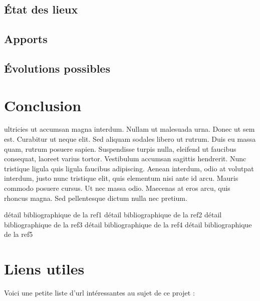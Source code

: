 \documentclass{EPUProjetDi}
\begin{document}
\section{État des lieux}
\section{Apports}

\section{Évolutions possibles}


\chapter*{Conclusion}
 ultricies ut accumsan magna interdum. Nullam ut malesuada urna. Donec ut sem est. Curabitur ut neque elit. Sed aliquam sodales libero ut rutrum. Duis eu massa quam, rutrum posuere sapien. Suspendisse turpis nulla, eleifend ut faucibus consequat, laoreet varius tortor. Vestibulum accumsan sagittis hendrerit. Nunc tristique ligula quis ligula faucibus adipiscing. Aenean interdum, odio at volutpat interdum, justo nunc tristique elit, quis elementum nisi ante id arcu. Mauris commodo posuere cursus. Ut nec massa odio. Maecenas at eros arcu, quis rhoncus magna. Sed pellentesque dictum nulla nec pretium.

\begin{thebibliography}{99}
\label{sec:biblio}
  détail bibliographique de la ref1
  détail bibliographique de la ref2
  détail bibliographique de la ref3
  détail bibliographique de la ref4
  détail bibliographique de la ref5
\end{thebibliography}


\appendix
{}


\chapter{Liens utiles\label{sec:liens_utiles}}
Voici une petite liste d'url intéressantes au sujet de ce projet :
\end{document}

